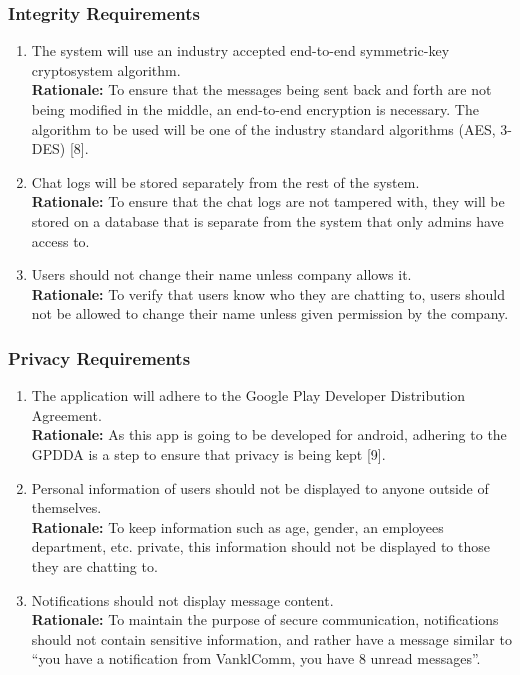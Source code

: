 \documentclass[]{article}
\begin{document}
\subsubsection{Integrity Requirements}
\label{ssub:integrity_requirements}
\begin{enumerate}[{SR-INT}1. ]
	\item The system will use an industry accepted end-to-end symmetric-key cryptosystem algorithm.
	      \\\textbf{Rationale:} To ensure that the messages being sent back and forth are not being modified in the middle, an end-to-end encryption is necessary. The algorithm to be used will be one of the industry standard algorithms (AES, 3-DES) [8].
	\item Chat logs will be stored separately from the rest of the system.
	      \\\textbf{Rationale:} To ensure that the chat logs are not tampered with, they will be stored on a database that is separate from the system that only admins have access to.
	\item Users should not change their name unless company allows it.
	      \\\textbf{Rationale:} To verify that users know who they are chatting to, users should not be allowed to change their name unless given permission by the company.

\end{enumerate}

\subsubsection{Privacy Requirements}
\label{ssub:privacy_requirements}
\begin{enumerate}[{SR-P}1. ]
	\item The application will adhere to the Google Play Developer Distribution Agreement.
	      \\\textbf{Rationale:} As this app is going to be developed for android, adhering to the GPDDA is a step to ensure that privacy is being kept [9].
	\item Personal information of users should not be displayed to anyone outside of themselves.
	      \\\textbf{Rationale:} To keep information such as age, gender, an employees department, etc. private, this information should not be displayed to those they are chatting to.
	\item Notifications should not display message content.
	      \\\textbf{Rationale:} To maintain the purpose of secure communication, notifications should not contain sensitive information, and rather have a message similar to “you have a notification from VanklComm, you have 8 unread messages”.

\end{enumerate}
\end{document}
